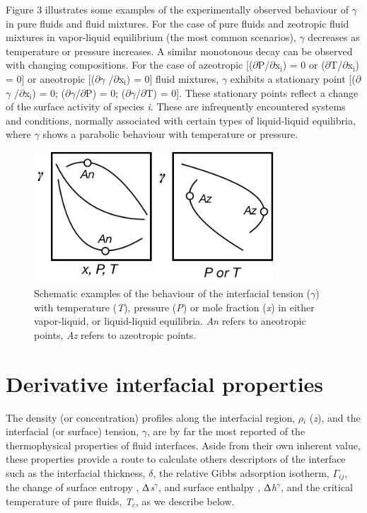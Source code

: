 \documentclass{scrbook}
\begin{document}
Figure 3 illustrates some examples of the experimentally observed behaviour of
$\gamma$ in pure fluids and fluid mixtures. For the case of pure fluids and
zeotropic fluid mixtures in vapor-liquid equilibrium (the most common
scenarios), {${\gamma}$} decreases as temperature or pressure increases.
A similar monotonous decay can be observed with changing compositions. For the
case of azeotropic [(${\partial}$P/${\partial}$x$_{\mathrm{i}}$) = 0 or
(${\partial}$T/${\partial}$x$_{\mathrm{i}}$) = 0] or aneotropic
[(${\partial}${${\gamma}$} /${\partial}$x$_{\mathrm{i}}$) = 0] fluid mixtures,
{${\gamma}$} exhibits a stationary point [(${\partial}${${\gamma}$}
/${\partial}$x$_{\mathrm{i}}$) = 0; (${\partial}${${\gamma}$}/${\partial}$P)
= 0; (${\partial}${${\gamma}$}/${\partial}$T) = 0]. These stationary points
reflect a change of the surface activity of species \textit{i}. These are
infrequently encountered systems and conditions, normally associated with
certain types of liquid-liquid equilibria, where {${\gamma}$} shows a parabolic
behaviour with temperature or pressure.
\begin{figure}
  \centering
  \includegraphics[width=0.8\textwidth]{gfx/image7.png}
  \caption{Schematic examples of the behaviour of the interfacial tension ({${\gamma}$}) with temperature (\textit{T}), pressure (\textit{P}) or mole fraction (\textit{x}) in either vapor-liquid, or liquid-liquid equilibria. \textit{An} refers to aneotropic points, \textit{Az} refers to azeotropic points.}
  \label{fig:2}
\end{figure}

\section{Derivative interfacial properties}

The density (or concentration) profiles along the interfacial region,
${\rho}$$_{i}$ (\textit{z}), and the interfacial (or surface) tension,
{${\gamma}$}, are by far the most reported of the thermophysical properties of
fluid interfaces. Aside from their own inherent value, these properties provide
a route to calculate others descriptors of the interface such as the
interfacial thickness, {${\delta}$}, the relative Gibbs adsorption isotherm,
${\Gamma}$$_{ij}$, the change of surface entropy
, ${\Updelta}$\textit{s}$^{{\gamma}}$, and surface enthalpy
, ${\Updelta}$\textit{h}$^{{\gamma}}$, and the critical temperature of pure
fluids, \textit{T}$_{c}$, as we describe below. 
\end{document}

